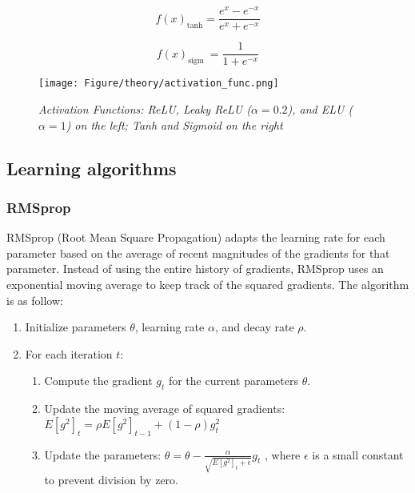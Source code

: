 \\\\
\begin{minipage}{0.5\textwidth}
	\begin{equation}
		f(x)_{\tanh }=\frac{e^x-e^{-x}}{e^x+e^{-x}}
		\label{eq:tanh}
	\end{equation}
\end{minipage}%
\begin{minipage}{0.5\textwidth}
	\begin{equation}
		f(x)_{\text {sigm }}=\frac{1}{1+e^{-x}}
		\label{eq:sigm}
	\end{equation}
\end{minipage}

\begin{figure}[h]
	\centering
	\texttt{[image: Figure/theory/activation\_func.png]} %
	\caption{\textit{Activation Functions: ReLU, Leaky ReLU ($\alpha = 0.2$), and ELU ($\alpha = 1$) on the left; Tanh and Sigmoid on the right}}
	\label{fig:activation_func}
\end{figure}

\subsection{Learning algorithms}

\subsubsection{RMSprop}
RMSprop (Root Mean Square Propagation) adapts the learning rate for each parameter based on the average of recent magnitudes of the gradients for that parameter. Instead of using the entire history of gradients, RMSprop uses an exponential moving average to keep track of the squared gradients. The algorithm is as follow:
\begin{enumerate}
	\item Initialize parameters $\theta$, learning rate $\alpha$, and decay rate $\rho$.
	\item For each iteration $t$:
	\begin{enumerate}
		\item Compute the gradient $g_t$ for the current parameters $\theta$.
		\item Update the moving average of squared gradients: $E[g^2]_t = \rho E[g^2]_{t-1} + (1 - \rho) g_t^2$
		\item Update the parameters: $\theta = \theta - \frac{\alpha}{\sqrt{E[g^2]_t + \epsilon}} g_t$ , where $\epsilon$ is a small constant to prevent division by zero.
	\end{enumerate}
\end{enumerate}

